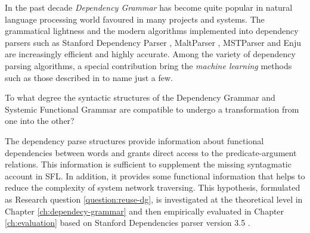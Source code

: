 
%
In the past decade \textit{Dependency Grammar} \citep{Tesniere2015} has become quite popular in natural language processing world favoured in many projects and systems. The grammatical lightness and the  modern algorithms implemented into dependency parsers such as Stanford Dependency Parser \citep{Marneffe2006}, MaltParser \citep{Nivre2006}, MSTParser \citep{McDonald2006} and Enju \citep{Miyao2005} are increasingly efficient and highly accurate. Among the variety of dependency parsing algorithms, a special contribution bring the \textit{machine learning} methods such as those described in \citet{mcdonald2005online, mcdonald2006online, carreras2007experiments, zhang2011transition, pei2015effective} to name just a few. 

\begin{question}\label{question:reuse-dg}
    To what degree the syntactic structures of the Dependency Grammar and Systemic Functional Grammar are compatible to undergo a transformation from one into the other?
\end{question}

The dependency parse structures provide information about functional dependencies between words and grants direct access to the predicate-argument relations. %
This information is sufficient to supplement the missing syntagmatic account in SFL. In addition, it provides some functional information that helps to reduce the complexity of system network traversing. 
This hypothesis, formulated as Research question \ref{question:reuse-dg}, is investigated at the theoretical level in Chapter \ref{ch:dependecy-grammar} and then empirically evaluated in Chapter \ref{ch:evaluation} based on Stanford Dependencies parser version 3.5 \citep{Marneffe2008a,Marneffe2008, Marneffe2014}.  


